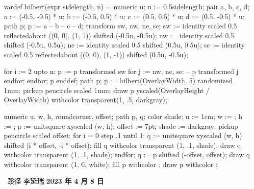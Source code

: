 \setupinteraction[
  title={ConTeXt 蹊径},
  author={李延瑞 (lyr.m2@live.cn)},
  keyword={TeX, ConTeXt MkIV, ConTeXt LMTX, LuaTeX, LuaMetaTeX}
]
\startMPinclusions
vardef hilbert(expr sidelength, n) = 
  numeric u; u := 0.5sidelength;
  pair a, b, c, d;
  a := (-0.5, -0.5) * u;
  b := (-0.5, 0.5) * u;
  c := (0.5, 0.5) * u;
  d := (0.5, -0.5) * u;
  path p; 
  p := a -- b -- c -- d;
  transform sw, nw, ne, se;
  sw := identity
        scaled 0.5
        reflectedabout ((0, 0), (1, 1))
        shifted (-0.5u, -0.5u);
  nw := identity
        scaled 0.5
        shifted (-0.5u, 0.5u);
  ne := identity
        scaled 0.5
        shifted (0.5u, 0.5u);
  se := identity
        scaled 0.5
        reflectedabout ((0, 0), (1, -1))
        shifted (0.5u, -0.5u);

  for i := 2 upto n:
    p := p transformed sw for j := nw, ne, se: -- p transformed j endfor;
  endfor;
  p
enddef;
\stopMPinclusions
{}
path p; p := hilbert(OverlayWidth, 5) randomized 1mm;
pickup pencircle scaled 1mm;
draw p yscaled(OverlayHeight / OverlayWidth) withcolor transparent(1, .5, darkgray); %
\stopuseMPgraphic
{}

numeric u, w, h, roundcorner, offset;
path p, q;
color shade;
u := 1cm; w := \overlaywidth; h := \overlayheight;
p := unitsquare xyscaled (w, h);
offset := 7pt;
shade := darkgray;
pickup pencircle scaled offset;
for i = 0 step .1 until 1:
    q := unitsquare xyscaled (w, h) shifted (i * offset, -i * offset);
    fill q withcolor transparent (1, .1, shade);
    draw q withcolor transparent (1, .1, shade);
endfor;
q := p shifted (-offset, offset);
draw q withcolor transparent (1, 0, white);
fill p withcolor ;
draw p withcolor ;
\stopuniqueMPgraphic
{}

\setupbackgrounds[page][background=TitleGraphic]
\startstandardmakeup
  \startcolor[white]
    \startcoverbox[middle][width=.6\textwidth,height=5cm,toffset=.8cm]
      \strut
      \hfil \bfd\ConTeXt\ 蹊径\hfil
      \blank[1cm]
      \hfil\bfa 李延瑞\hfil
      \blank[.25cm]
      \hfil\bf 2023 年 4 月 8 日\hfil
    \stopcoverbox
  \stopcolor
  \blank[14cm]
\stopstandardmakeup
\setupbackgrounds[page][background=]